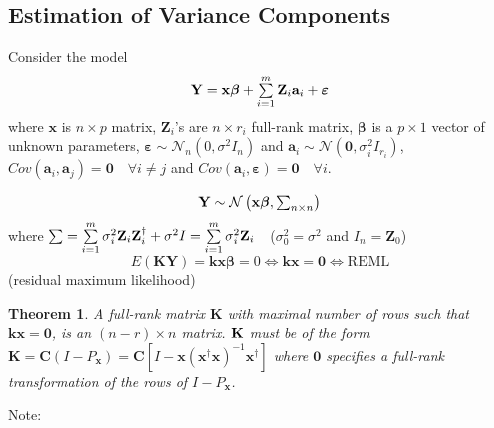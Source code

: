 \documentclass{article}
\newtheorem{theorem}{Theorem}
\begin{document}
\bigskip

\subsection{Estimation of Variance Components}

Consider the model%
\begin{equation*}
\mathbf{Y}=\mathbf{x\beta }+\tsum\limits_{i=1}^{m}\mathbf{Z}_{i}\mathbf{a}%
_{i}+\mathbf{\varepsilon }
\end{equation*}%
where $\mathbf{x}$ is $n\times p$ matrix, $\mathbf{Z}_{i}$'s are $n\times
r_{i}$ full-rank matrix, $\mathbf{\beta }$ is a $p\times 1$ vector of
unknown parameters, $\mathbf{\varepsilon \sim }\mathcal{N}_{n}\left(
0,\sigma ^{2}I_{n}\right) $ and $\mathbf{a}_{i}\sim \mathcal{N}\left( 
\mathbf{0},\sigma _{i}^{2}I_{r_{i}}\right) $, $Cov\left( \mathbf{a}_{i},%
\mathbf{a}_{j}\right) =\mathbf{0}\quad \forall i\neq j$ and $Cov\left( 
\mathbf{a}_{i},\mathbf{\varepsilon }\right) =\mathbf{0}\quad \forall i$.

\bigskip

\begin{equation*}
\therefore \mathbf{Y}\sim \mathcal{N}\left( \mathbf{x\beta }%
,\tsum\nolimits_{n\times n}\right)
\end{equation*}%
where $\tsum =\tsum\limits_{i=1}^{m}\sigma _{i}^{2}\mathbf{Z}_{i}\mathbf{Z}%
_{i}^{\dagger }+\sigma ^{2}I=\tsum\limits_{i=1}^{m}\sigma _{i}^{2}\mathbf{Z}%
_{i}\quad $($\sigma _{0}^{2}=\sigma ^{2}$ and $I_{n}=\mathbf{Z}_{0}$)%
\begin{equation*}
E\left( \mathbf{KY}\right) =\mathbf{kx\beta }=0\Leftrightarrow \mathbf{kx}=%
\mathbf{0}\Leftrightarrow \text{REML}
\end{equation*}%
(residual maximum likelihood)

\bigskip

\begin{theorem}
A full-rank matrix $\mathbf{K}$ with maximal number of rows such that $%
\mathbf{kx}=\mathbf{0}$, is an $\left( n-r\right) \times n$ matrix. $\mathbf{%
K}$ must be of the form $\mathbf{K}=\mathbf{C}\left( I-P_{\mathbf{x}}\right)
=\mathbf{C}\left[ I-\mathbf{x}\left( \mathbf{x}^{\dagger }\mathbf{x}\right)
^{-1}\mathbf{x}^{\dagger }\right] $ where $\mathbf{0}$ specifies a full-rank
transformation of the rows of $I-P_{\mathbf{x}}$.
\end{theorem}

\bigskip

Note:
\end{document}
